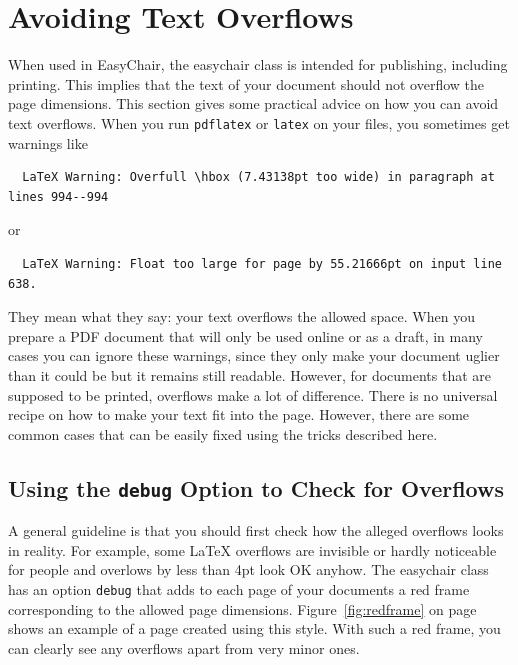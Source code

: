 \documentclass{easychair}
\newcommand{\easychair}{\textsf{easychair}}
\begin{document}
\section{Avoiding Text Overflows}

When used in EasyChair, the {\easychair} class is intended for
publishing, including printing. This implies that the text of your
document should not overflow the page dimensions. This section gives
some practical advice on how you can avoid text overflows. When you
run \texttt{pdflatex} or \texttt{latex} on your files, you sometimes
get warnings like

\small
\begin{verbatim}
  LaTeX Warning: Overfull \hbox (7.43138pt too wide) in paragraph at lines 994--994
\end{verbatim}
\normalsize
or

\small
\begin{verbatim}
  LaTeX Warning: Float too large for page by 55.21666pt on input line 638.
\end{verbatim}
\normalsize
They mean what they say: your text overflows the allowed space. When
you prepare a PDF document that will only be used online or as a
draft, in many cases you can ignore these warnings, since they only
make your document uglier than it could be but it remains still
readable. However, for documents that are supposed to be printed,
overflows make a lot of difference. There is no universal recipe on
how to make your text fit into the page. However, there are some
common cases that can be easily fixed using the tricks described
here. 

\subsection{Using the \texttt{debug} Option to Check for Overflows}

A general guideline is that you should first check how the alleged
overflows looks in reality. For example, some LaTeX overflows are
invisible or hardly noticeable for people and overlows by
less than 4pt look OK anyhow. The {\easychair} class has an option
\texttt{debug} that adds to each page of your documents a red frame
corresponding to the allowed page
dimensions. Figure~\ref{fig:redframe} on page~\pageref{fig:redframe}
shows an example of a page created using this style. With such a red
frame, you can clearly see any overflows apart from very minor ones.
\end{document}
